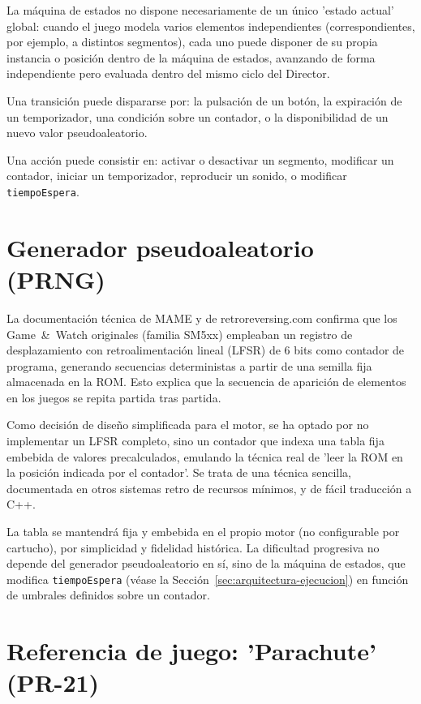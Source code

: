 \documentclass[../main.tex]{subfiles}
\begin{document}
	La máquina de estados no dispone necesariamente de un único 'estado actual' global: cuando el juego modela varios elementos independientes (correspondientes, por ejemplo, a distintos segmentos), cada uno puede disponer de su propia instancia o posición dentro de la máquina de estados, avanzando de forma independiente pero evaluada dentro del mismo ciclo del Director.

	Una transición puede dispararse por: la pulsación de un botón, la expiración de un temporizador, una condición sobre un contador, o la disponibilidad de un nuevo valor pseudoaleatorio.

	Una acción puede consistir en: activar o desactivar un segmento, modificar un contador, iniciar un temporizador, reproducir un sonido, o modificar \texttt{tiempoEspera}.

	\section{Generador pseudoaleatorio (PRNG)}
	\label{sec:prng}

	La documentación técnica de MAME y de retroreversing.com confirma que los Game~\&~Watch originales (familia SM5xx) empleaban un registro de desplazamiento con retroalimentación lineal (LFSR) de 6 bits como contador de programa, generando secuencias deterministas a partir de una semilla fija almacenada en la ROM. Esto explica que la secuencia de aparición de elementos en los juegos se repita partida tras partida.

	Como decisión de diseño simplificada para el motor, se ha optado por no implementar un LFSR completo, sino un contador que indexa una tabla fija embebida de valores precalculados, emulando la técnica real de 'leer la ROM en la posición indicada por el contador'. Se trata de una técnica sencilla, documentada en otros sistemas retro de recursos mínimos, y de fácil traducción a C++.

	La tabla se mantendrá fija y embebida en el propio motor (no configurable por cartucho), por simplicidad y fidelidad histórica. La dificultad progresiva no depende del generador pseudoaleatorio en sí, sino de la máquina de estados, que modifica \texttt{tiempoEspera} (véase la Sección~\ref{sec:arquitectura-ejecucion}) en función de umbrales definidos sobre un contador.

	\section{Referencia de juego: 'Parachute' (PR-21)}
	\label{sec:parachute}
\end{document}
